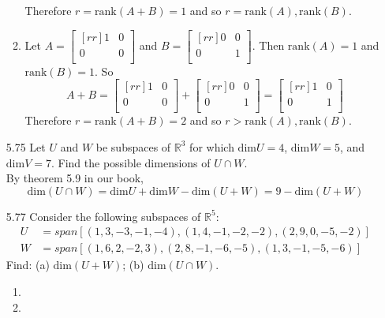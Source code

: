 \documentclass[12pt]{article}
\begin{document}
\begin{enumerate}
\begin{enumerate}
	Therefore $r=\mathrm{rank}(A+B)=1$ and so $r=\mathrm{rank}(A),\mathrm{rank}(B)$.
	\item Let $A=\begin{bmatrix}[rr]1&0\\0&0\\\end{bmatrix}$ and $B=\begin{bmatrix}[rr]0&0\\0&1\\\end{bmatrix}$. Then $\mathrm{rank}(A) = 1$ and $\mathrm{rank}(B) = 1$. So
	\[ A+B = \begin{bmatrix}[rr]1&0\\0&0\\\end{bmatrix}+\begin{bmatrix}[rr]0&0\\0&1\\\end{bmatrix}=\begin{bmatrix}[rr]1&0\\0&1\\\end{bmatrix} \]
	Therefore $r=\mathrm{rank}(A+B)=2$ and so $r>\mathrm{rank}(A),\mathrm{rank}(B)$.
	\end{enumerate}

\item[5.75] Let $U$ and $W$ be subspaces of $\mathbb{R}^3$ for which $\mathrm{dim}U=4$, $\mathrm{dim}W=5$, and $\mathrm{dim}V=7$. Find the possible dimensions of $U \cap W$.\\
	By theorem 5.9 in our book,
	\[ \mathrm{dim}(U\cap W) = \mathrm{dim}U+\mathrm{dim}W-\mathrm{dim}(U+W)=9-\mathrm{dim}(U+W) \]
	

\item[5.77] Consider the following subspaces of $\mathbb{R}^5$:
	\begin{align*}
		U &= span[(1,3,-3,-1,-4),(1,4,-1,-2,-2),(2,9,0,-5,-2)]\\
		W &= span[(1,6,2,-2,3),(2,8,-1,-6,-5),(1,3,-1,-5,-6)]
	\end{align*}
	Find: (a) $\mathrm{dim}(U+W)$; (b) $\mathrm{dim}(U\cap W)$.
	\begin{enumerate}
	\item
	\item
	\end{enumerate}


\end{enumerate}
\end{document}
